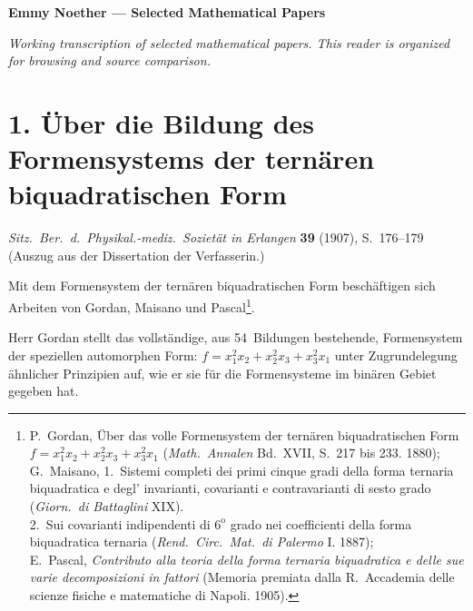 \documentclass[11pt,a4paper]{article}
\theoremstyle{plain}
\theoremstyle{definition}
\begin{document}
\begin{center}
\Large\textbf{Emmy Noether --- Selected Mathematical Papers}
\end{center}

\vspace{1em}
\noindent\textit{Working transcription of selected mathematical papers. This reader is organized for browsing and source comparison.}

\vspace{1em}


\section*{1. \"Uber die Bildung des Formensystems der tern\"aren biquadratischen Form}

\begin{center}
\textit{Sitz.~Ber.~d.~Physikal.-mediz.~Soziet\"at in Erlangen} \textbf{39} (1907), S.~176--179\\
(Auszug aus der Dissertation der Verfasserin.)
\end{center}

\vspace{0.5cm}

Mit dem Formensystem der tern\"aren biquadratischen Form besch\"aftigen sich Arbeiten von Gordan, Maisano und Pascal\footnote{P.~Gordan, \"Uber das volle Formensystem der tern\"aren biquadratischen Form $f = x_1^2 x_2 + x_2^2 x_3 + x_3^2 x_1$ (\textit{Math.~Annalen} Bd.~XVII, S.~217 bis 233. 1880);\\G.~Maisano, 1.~Sistemi completi dei primi cinque gradi della forma ternaria biquadratica e degl' invarianti, covarianti e contravarianti di sesto grado (\textit{Giorn.~di Battaglini} XIX).\\\hspace*{1.5em}2.~Sui covarianti indipendenti di $6^{\mathrm{o}}$ grado nei coefficienti della forma biquadratica ternaria (\textit{Rend.~Circ.~Mat.~di Palermo} I. 1887);\\E.~Pascal, \textit{Contributo alla teoria della forma ternaria biquadratica e delle sue varie decomposizioni in fattori} (Memoria premiata dalla R.~Accademia delle scienze fisiche e matematiche di Napoli. 1905).}.

Herr Gordan stellt das vollst\"andige, aus 54~Bildungen bestehende, Formensystem der speziellen automorphen Form: $f = x_1^2 x_2 + x_2^2 x_3 + x_3^2 x_1$ unter Zugrundelegung \"ahnlicher Prinzipien auf, wie er sie f\"ur die Formensysteme im bin\"aren Gebiet gegeben hat.
\end{document}
